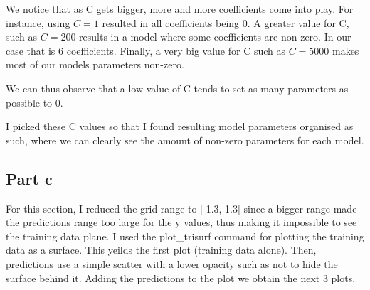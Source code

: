 \documentclass[10pt]{article}
\begin{document}
We notice that as C gets bigger, more and more coefficients come into play.
For instance, using $C=1$ resulted in all coefficients being 0. A greater value for C,
such as $C = 200$ results in a model where some coefficients are non-zero. In our case that is
6 coefficients. Finally, a very big value for C such as $C = 5000$ makes most of our models
parameters non-zero.

We can thus observe that a low value of C tends to set as many parameters as possible to 0.

I picked these C values so that I found resulting model parameters organised as such,
where we can clearly see the amount of non-zero parameters for each model.

  
\subsection*{Part c}
For this section, I reduced the grid range to [-1.3, 1.3]
since a bigger range made the predictions range too large for the y values, thus making it 
impossible to see the training data plane. I used the plot\_trisurf command
for plotting the training data as a surface. 
This yeilds the first plot (training data alone).
Then, predictions use a simple scatter 
with a lower opacity such as not to hide the surface behind it.
Adding the predictions to the plot we obtain the next 3 plots.
\end{document}
